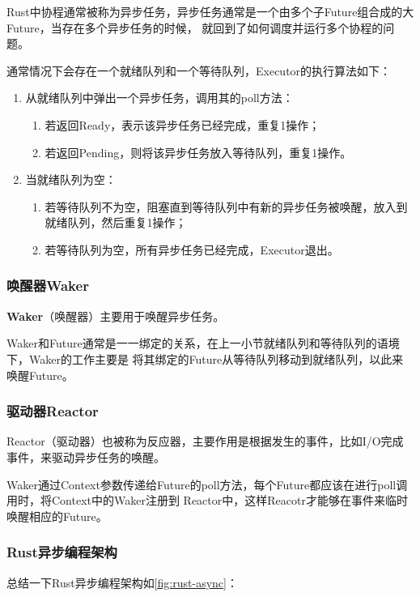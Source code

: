 \documentclass[supercite]{HustGraduPaper}
\newcommand{\rfig}[1]{\autoref{fig:#1}}
\theoremstyle{definition}
\begin{document}
Rust中协程通常被称为异步任务，异步任务通常是一个由多个子Future组合成的大Future，当存在多个异步任务的时候，
就回到了如何调度并运行多个协程的问题。\par

通常情况下会存在一个就绪队列和一个等待队列，Executor的执行算法如下：
\begin{enumerate}[label={(\arabic*)}]
  \item 从就绪队列中弹出一个异步任务，调用其的poll方法：
    \begin{enumerate}
      \item 若返回Ready，表示该异步任务已经完成，重复1操作；
      \item 若返回Pending，则将该异步任务放入等待队列，重复1操作。
    \end{enumerate}
  \item 当就绪队列为空：
    \begin{enumerate}
      \item 若等待队列不为空，阻塞直到等待队列中有新的异步任务被唤醒，放入到就绪队列，然后重复1操作；
      \item 若等待队列为空，所有异步任务已经完成，Executor退出。
    \end{enumerate}
\end{enumerate}

\subsubsection{唤醒器Waker}
\textbf{Waker}（唤醒器）主要用于唤醒异步任务。\par

Waker和Future通常是一一绑定的关系，在上一小节就绪队列和等待队列的语境下，Waker的工作主要是
将其绑定的Future从等待队列移动到就绪队列，以此来唤醒Future。\par

\subsubsection{驱动器Reactor}
Reactor（驱动器）也被称为反应器，主要作用是根据发生的事件，比如I/O完成事件，来驱动异步任务的唤醒。\par

Waker通过Context参数传递给Future的poll方法，每个Future都应该在进行poll调用时，将Context中的Waker注册到
Reactor中，这样Reacotr才能够在事件来临时唤醒相应的Future。\par

\subsubsection{Rust异步编程架构}
总结一下Rust异步编程架构如\rfig{rust-async}：
\end{document}
